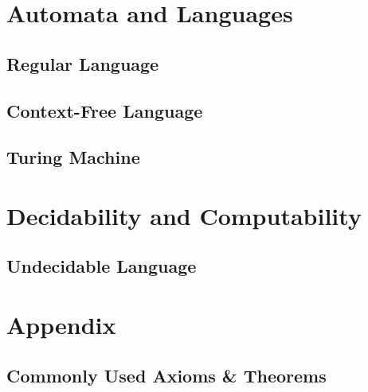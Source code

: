 \documentclass[11pt,fleqn,dvipsnames]{book} %
\begin{document}
\pagestyle{fancy} %

\setlength{\parskip}{1em}

\part{Automata and Languages}

\chapter{Regular Language}


\chapter{Context-Free Language}


\chapter{Turing Machine}


\part{Decidability and Computability}

\chapter{Undecidable Language}


\part*{Appendix}
\appendix
\chapter*{Commonly Used Axioms \& Theorems}

\renewcommand{\leftmark}{\sffamily\bfseries Axioms \& Theorems}
\renewcommand{\rightmark}{\sffamily\bfseries Axioms \& Theorems}
\end{document}
